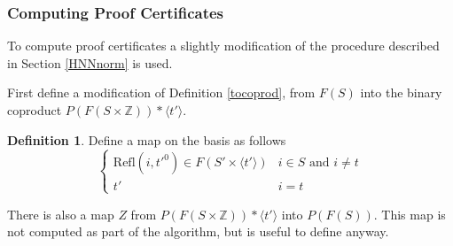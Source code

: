 \documentclass[11pt]{article} %
\theoremstyle{definition}
\theoremstyle{definition}
\theoremstyle{definition}
\theoremstyle{definition}
\theoremstyle{definition}
\newtheorem{defn}[theorem]{Definition}
\theoremstyle{definition}
\begin{document}


\subsubsection{Computing Proof Certificates}\label{HNNPC}

To compute proof certificates a slightly modification of the procedure described in Section
\ref{HNNnorm} is used.

First define a modification of Definition \ref{tocoprod}, from $F(S)$ into the binary
coproduct $P(F(S \times \mathbb{Z})) \ast \langle t' \rangle$.

\begin{defn}\label{tocoprodP}
  Define a map on the basis as follows
  \begin{equation}
    \begin{cases}
      \text{Refl}(i, t'^0) \in F(S' \times \langle t' \rangle) & i \in S \text{ and } i \ne t \\
      t' & i = t
    \end{cases}
  \end{equation}
\end{defn}

There is also a map $Z$ from $P(F(S \times \mathbb{Z})) \ast \langle t' \rangle$ into
$P(F(S))$. This map is not computed as part of the algorithm, but is useful to define anyway.
\end{document}
